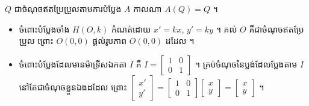 \begin{formulaBox}[ជាទូទៅ]
$Q$ ជាចំណុចឥតប្រែប្រួលតាមការបំប្លែង $A$ កាលណា $A(Q) = Q$ ។
\end{formulaBox}

\begin{itemize}
  \item ចំពោះបំប្លែងចាំង $H(O, k)$ កំណត់ដោយ $x' = kx$, $y' = ky$ ។ គល់ $O$ គឺជាចំណុចឥតប្រែប្រួល ព្រោះ $O(0, 0)$ ផ្ដល់រូបភាព $O(0, 0)$ ដដែល ។
  \item ចំពោះបំប្លែងដែលមានម៉ាទ្រីសឯកតា $I$ គឺ $I = \begin{bmatrix} 1 & 0\\ 0 & 1 \end{bmatrix}$ ។ គ្រប់ចំណុចនៃប្លង់ដែលប្លែងតាម $I$ នៅតែជាចំណុចខ្លួនឯងដដែល ព្រោះ $\begin{bmatrix} x'\\ y' \end{bmatrix} = \begin{bmatrix} 1 & 0\\ 0 & 1 \end{bmatrix}\begin{bmatrix} x\\ y \end{bmatrix} = \begin{bmatrix} x\\ y \end{bmatrix}$ ។
\end{itemize}

